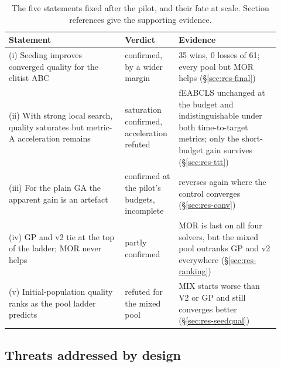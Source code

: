 \documentclass[review]{elsarticle}
\begin{document}
\begin{table}[htbp]
\centering
\caption{The five statements fixed after the pilot, and their fate at
scale. Section references give the supporting evidence.}
\label{tab:hyp}
\small
\begin{tabular}{p{0.40\linewidth}p{0.17\linewidth}p{0.35\linewidth}}
\toprule
Statement & Verdict & Evidence \\
\midrule
(i) Seeding improves converged quality for the elitist ABC
 & confirmed, by a wider margin
 & 35 wins, 0 losses of 61; every pool but MOR helps
   (\S\ref{sec:res-final}) \\
(ii) With strong local search, quality saturates but metric-A
acceleration remains
 & saturation confirmed, acceleration refuted
 & fEABCLS unchanged at the budget and indistinguishable under both
   time-to-target metrics; only the short-budget gain survives
   (\S\ref{sec:res-ttt}) \\
(iii) For the plain GA the apparent gain is an artefact
 & confirmed at the pilot's budgets, incomplete
 & reverses again where the control converges (\S\ref{sec:res-conv}) \\
(iv) GP and v2 tie at the top of the ladder; MOR never helps
 & partly confirmed
 & MOR is last on all four solvers, but the mixed pool outranks GP and v2
   everywhere (\S\ref{sec:res-ranking}) \\
(v) Initial-population quality ranks as the pool ladder predicts
 & refuted for the mixed pool
 & MIX starts worse than V2 or GP and still converges better
   (\S\ref{sec:res-seedqual}) \\
\bottomrule
\end{tabular}
\end{table}

\subsection{Threats addressed by design}\label{sec:res-threats}
\end{document}
